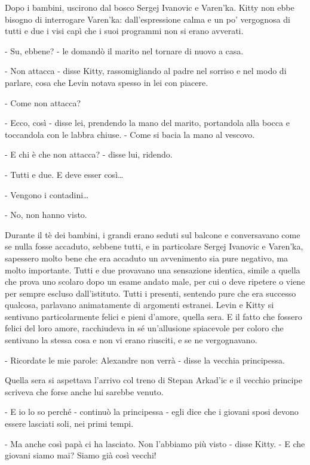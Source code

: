 Dopo i bambini, uscirono dal bosco Sergej Ivanovic e Varen'ka. Kitty non ebbe bisogno di interrogare Varen'ka: dall'espressione calma e un po' vergognosa di tutti e due i visi capì che i suoi programmi non si erano avverati. 

- Su, ebbene? - le domandò il marito nel tornare di nuovo a casa. 

- Non attacca - disse Kitty, rassomigliando al padre nel sorriso e nel modo di parlare, cosa che Levin notava spesso in lei con piacere. 

- Come non attacca? 

- Ecco, così - disse lei, prendendo la mano del marito, portandola alla bocca e toccandola con le labbra chiuse. - Come si bacia la mano al vescovo. 

- E chi è che non attacca? - disse lui, ridendo. 

- Tutti e due. E deve esser così\ldots{} 

- Vengono i contadini\ldots{} 

- No, non hanno visto. 

\label{vi-5} 

Durante il tè dei bambini, i grandi erano seduti sul balcone e conversavano come se nulla fosse accaduto, sebbene tutti, e in particolare Sergej Ivanovic e Varen'ka, sapessero molto bene che era accaduto un avvenimento sia pure negativo, ma molto importante. Tutti e due provavano una sensazione identica, simile a quella che prova uno scolaro dopo un esame andato male, per cui o deve ripetere o viene per sempre escluso dall'istituto. Tutti i presenti, sentendo pure che era successo qualcosa, parlavano animatamente di argomenti estranei. Levin e Kitty si sentivano particolarmente felici e pieni d'amore, quella sera. E il fatto che fossero felici del loro amore, racchiudeva in sé un'allusione spiacevole per coloro che sentivano la stessa cosa e non vi erano riusciti, e se ne vergognavano. 

- Ricordate le mie parole: Alexandre non verrà - disse la vecchia principessa. 

Quella sera si aspettava l'arrivo col treno di Stepan Arkad'ic e il vecchio principe scriveva che forse anche lui sarebbe venuto. 

- E io lo so perché - continuò la principessa - egli dice che i giovani sposi devono essere lasciati soli, nei primi tempi. 

- Ma anche così papà ci ha lasciato. Non l'abbiamo più visto - disse Kitty. - E che giovani siamo mai? Siamo già così vecchi! 

